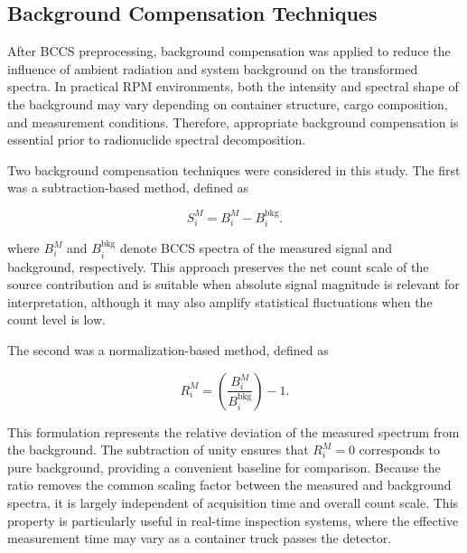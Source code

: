 \documentclass[fleqn, 10pt]{wlscirep}
\begin{document}


\subsection*{Background Compensation Techniques}

After BCCS preprocessing, background compensation was applied to reduce the influence of ambient radiation and system background on the transformed spectra. In practical RPM environments, both the intensity and spectral shape of the background may vary depending on container structure, cargo composition, and measurement conditions. Therefore, appropriate background compensation is essential prior to radionuclide spectral decomposition.

Two background compensation techniques were considered in this study. The first was a subtraction-based method, defined as 

\begin{equation}
S^M_i =  B^M_i - B_i^{\textrm{bkg}}. \label{eq:DS}
\end{equation}

where $B_i^M$ and $B_i^\text{bkg}$ denote BCCS spectra of the measured signal and background, respectively. This approach preserves the net count scale of the source contribution and is suitable when absolute signal magnitude is relevant for interpretation, although it may also amplify statistical fluctuations when the count level is low.

The second was a normalization-based method, defined as 

\begin{equation}
R^M_i = \left(\dfrac{B^M_i}{B^{\textrm{bkg}}_i}\right) -1.\label{eq:NB}
\end{equation}

This formulation represents the relative deviation of the measured spectrum from the background. The subtraction of unity ensures that 
$R_i^M = 0$ corresponds to pure background, providing a convenient baseline for comparison. Because the ratio removes the common scaling factor between the measured and background spectra, it is largely independent of acquisition time and overall count scale. This property is particularly useful in real-time inspection systems, where the effective measurement time may vary as a container truck passes the detector.
\end{document}
